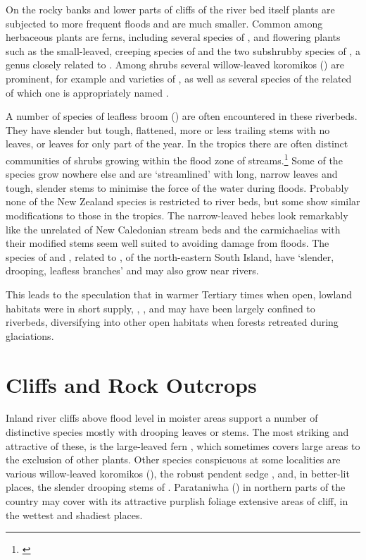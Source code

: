 On the rocky banks and lower parts of cliffs of the river bed itself plants are subjected to more frequent floods and are much smaller.
Common among herbaceous plants are ferns, including several species of , and flowering plants such as the small-leaved, creeping species of  and the two subshrubby species of , a genus closely related to .
Among shrubs several willow-leaved koromikos () are prominent, for example  and varieties of , as well as several species of the related  of which one is appropriately named .

A number of species of leafless broom () are often encountered in these riverbeds.
They have slender but tough, flattened, more or less trailing stems with no leaves, or leaves for only part of the year.
In the tropics there are often distinct communities of shrubs growing within the flood zone of streams.\footnote{\cite{ansteenis1981rheophytes}}
Some of the species grow nowhere else and are `streamlined' with long, narrow leaves and tough, slender stems to minimise the force of the water during floods.
Probably none of the New Zealand species is restricted to river beds, but some show similar modifications to those in the tropics.
The narrow-leaved hebes look remarkably like the unrelated  of New Caledonian stream beds and the carmichaelias with their modified stems seem well suited to avoiding damage from floods.
The species of  and , related to , of the north-eastern South Island, have `slender, drooping, leafless branches' and may also grow near rivers.

This leads to the speculation that in warmer Tertiary times when open, lowland habitats were in short supply, , , and  may have been largely confined to riverbeds, diversifying into other open habitats when forests retreated during glaciations.

\section{Cliffs and Rock Outcrops}

Inland river cliffs above flood level in moister areas support a number of distinctive species mostly with drooping leaves or stems.
The most striking and attractive of these, is the large-leaved fern , which sometimes covers large areas to the exclusion of other plants.
Other species conspicuous at some localities are various willow-leaved koromikos (), the robust pendent sedge , and, in better-lit places, the slender drooping stems of .
Parataniwha () in northern parts of the country may cover with its attractive purplish foliage extensive areas of cliff, in the wettest and shadiest places.

